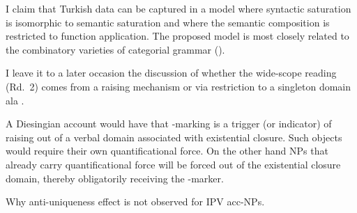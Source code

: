 \documentclass[11pt,a4paper]{article}
\begin{document}
I claim that Turkish data can be captured in a model where syntactic saturation is isomorphic to semantic saturation and where the semantic composition is restricted to function application. The proposed model is most closely related to the combinatory varieties of categorial grammar (\cite{tsp,jacobson07}). 



I leave it to a later occasion the discussion of whether the wide-scope
reading (Rd.\ 2) comes from a raising mechanism or via restriction to a
singleton domain ala .

A Diesingian account would have that \acc-marking is a trigger (or indicator) of
raising out of a verbal domain associated with existential closure. Such objects
would require their own quantificational force. On the other hand NPs that
already carry quantificational force will be forced out of the existential
closure domain, thereby obligatorily receiving the \acc-marker.


\begin{uquestion}
Why anti-uniqueness effect is not observed for IPV acc-NPs.
\end{uquestion}
\end{document}

